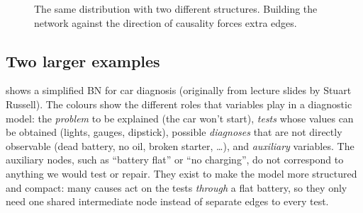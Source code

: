 \documentclass[11pt, oneside]{book}
\let\originalsubsection\subsection
\renewcommand{\subsection}{\Needspace{6\baselineskip}\originalsubsection}
\begin{document}
\begin{figure}[htbp]
\centering
{}
\caption{The same distribution with two different structures. Building the
network against the direction of causality forces extra edges.}
\label{fig:anticausal}
\end{figure}

\subsection{Two larger examples}

 shows a simplified BN for car diagnosis (originally from
lecture slides by Stuart Russell). The colours show the different roles that
variables play in a diagnostic model: the \emph{problem} to be explained (the
car won't start), \emph{tests} whose values can be obtained (lights, gauges,
dipstick), possible \emph{diagnoses} that are not directly observable (dead
battery, no oil, broken starter, \ldots), and \emph{auxiliary} variables. The
auxiliary nodes, such as ``battery flat'' or ``no charging'', do not
correspond to anything we would test or repair. They exist to make the model
more structured and compact: many causes act on the tests \emph{through} a
flat battery, so they only need one shared intermediate node instead of
separate edges to every test.
\end{document}
